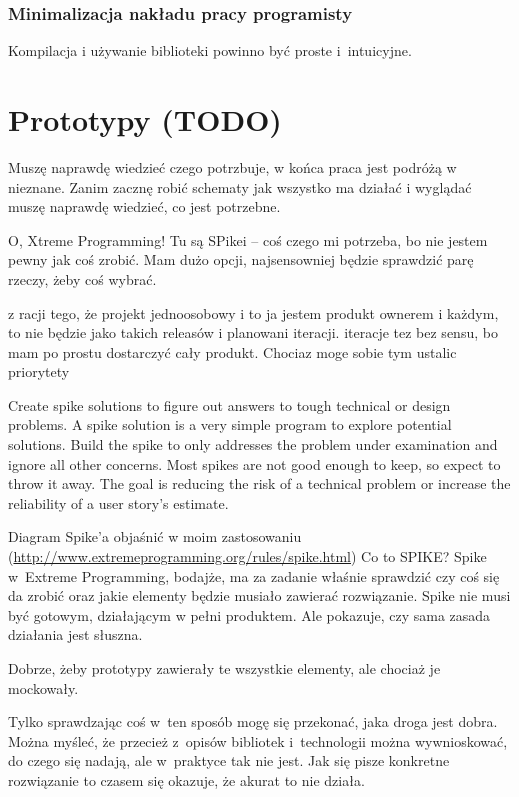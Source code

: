 \subsubsection{Minimalizacja nakładu pracy programisty}
Kompilacja i używanie biblioteki powinno być proste i~intuicyjne.



\section{Prototypy (TODO)}
Muszę naprawdę wiedzieć czego potrzbuje, w końca praca jest podróżą w nieznane. Zanim zacznę robić schematy jak wszystko ma działać i wyglądać muszę naprawdę wiedzieć, co jest potrzebne.

O, Xtreme Programming! Tu są SPikei -- coś czego mi potrzeba, bo nie jestem pewny jak coś zrobić. Mam dużo opcji, najsensowniej będzie sprawdzić parę rzeczy, żeby coś wybrać.

z racji tego, że projekt jednoosobowy i to ja jestem produkt ownerem i każdym, to nie będzie jako takich releasów i planowani iteracji. iteracje tez bez sensu, bo mam po prostu dostarczyć cały produkt. Chociaz moge sobie tym ustalic priorytety

Create spike solutions to figure out answers to tough technical or design problems. A spike solution is a very simple program to explore potential solutions. Build the spike to only addresses the problem under examination and ignore all other concerns. Most spikes are not good enough to keep, so expect to throw it away. The goal is reducing the risk of a technical problem or increase the reliability of a user story's estimate.

Diagram Spike'a objaśnić w moim zastosowaniu (\url{http://www.extremeprogramming.org/rules/spike.html})
Co to SPIKE? Spike w~Extreme Programming, bodajże, ma za zadanie właśnie sprawdzić czy coś się da zrobić oraz jakie elementy będzie musiało zawierać rozwiązanie.
Spike nie musi być gotowym, działającym w pełni produktem. Ale pokazuje, czy sama zasada działania jest słuszna.


Dobrze, żeby prototypy zawierały te wszystkie elementy, ale chociaż je mockowały.

Tylko sprawdzając coś w~ten sposób mogę się przekonać, jaka droga jest dobra. Można myśleć, że przecież z~opisów bibliotek i~technologii można wywnioskować, do czego się nadają, ale w~praktyce tak nie jest. Jak się pisze konkretne rozwiązanie to czasem się okazuje, że akurat to nie działa.


